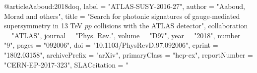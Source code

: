 

@article{Aaboud:2018doq,
      label          = "ATLAS-SUSY-2016-27",
      author         = "Aaboud, Morad and others",
      title          = "{Search for photonic signatures of gauge-mediated
                        supersymmetry in 13 TeV $pp$ collisions with the ATLAS
                        detector}",
      collaboration  = "ATLAS",
      journal        = "Phys. Rev.",
      volume         = "D97",
      year           = "2018",
      number         = "9",
      pages          = "092006",
      doi            = "10.1103/PhysRevD.97.092006",
      eprint         = "1802.03158",
      archivePrefix  = "arXiv",
      primaryClass   = "hep-ex",
      reportNumber   = "CERN-EP-2017-323",
      SLACcitation   = "%
}


